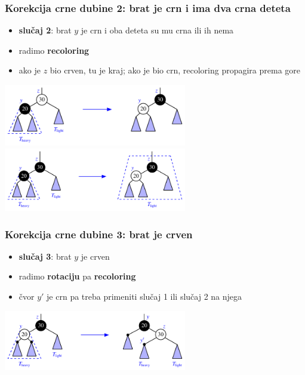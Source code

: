 \documentclass[compress]{beamer}
\begin{document}
\begin{frame}[fragile]
  \frametitle{Korekcija crne dubine 2: brat je crn i ima dva crna deteta}  
  \begin{itemize}
    \item \textbf{slučaj 2}: brat $y$ je crn i oba deteta su mu crna ili ih nema
    \item radimo \textbf{recoloring}
    \item ako je $z$ bio crven, tu je kraj; ako je bio crn, recoloring propagira prema gore
  \end{itemize}
  \begin{center}
    \includegraphics[width=8cm]{asp-11-pic43a.pdf} \\
    \includegraphics[width=8cm]{asp-11-pic43b.pdf} \\
  \end{center}
\end{frame}

\begin{frame}[fragile]
  \frametitle{Korekcija crne dubine 3: brat je crven}
  \begin{itemize}
    \item \textbf{slučaj 3}: brat $y$ je crven
    \item radimo \textbf{rotaciju} pa \textbf{recoloring}
    \item čvor $y'$ je crn pa treba primeniti slučaj 1 ili slučaj 2 na njega
  \end{itemize}
  \begin{center}
    \includegraphics[width=8cm]{asp-11-pic44.pdf}
  \end{center}
\end{frame}
\end{document}
